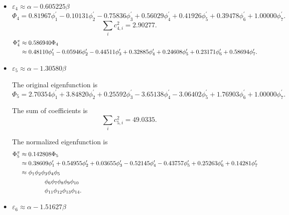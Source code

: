 \documentclass[a4paper]{book}
\begin{document}
\begin{solution}
\begin{enumerate}[label=(\alph*)]
\begin{itemize}
		
		\item $\varepsilon_4 \approx \alpha - 0.605225 \beta$
		\begin{equation*}
			\Phi_4 = 0.81967 \phi^\prime_1 -0.10131 \phi^\prime_2 -0.75836 \phi^\prime_3 + 0.56029 \phi^\prime_4 + 0.41926 \phi^\prime_5 + 0.39478 \phi^\prime_6 + 1.00000 \phi^\prime_7.
		\end{equation*}
		\begin{equation*}
			\sum_{i} c^2_{4,i} = 2.90277.
		\end{equation*}
		\begin{align}
			\Phi^\pi_4 &\approx 0.586940 \Phi_4 \notag \\
			&\approx 0.48110 \phi^\prime_1 - 0.05946 \phi^\prime_2 -0.44511 \phi^\prime_3 +0.32885 \phi^\prime_4 + 0.24608 \phi^\prime_5 + 0.23171 \phi^\prime_6 + 0.58694 \phi^\prime_7.
		\end{align}
		
		
		\item $\varepsilon_5 \approx \alpha -1.30580 \beta$
		
		The original eigenfunction is
		\begin{equation*}
			\Phi_5 = 2.70354 \phi^\prime_1 + 3.84820 \phi^\prime_2 +0.25592 \phi^\prime_3 -3.65138 \phi^\prime_4 - 3.06402 \phi^\prime_5 + 1.76903 \phi^\prime_6 + 1.00000 \phi^\prime_7.
		\end{equation*}
		
		The sum of coefficients is
		\begin{equation*}
			\sum_{i} c^2_{5,i} = 49.0335.
		\end{equation*}
		
		The normalized eigenfunction is
		\begin{align}
			\Phi^\pi_5 &\approx 0.142808 \Phi_5 \notag \\
			&\approx 0.38609 \phi^\prime_1 + 0.54955 \phi^\prime_2 +0.03655 \phi^\prime_3 -0.52145 \phi^\prime_4 - 0.43757 \phi^\prime_5 + 0.25263 \phi^\prime_6 + 0.14281 \phi^\prime_7\\
			&\approx \phi_1  \phi_2 \phi_3 \phi_4 \phi_5  \notag \\
			&\hspace*{4em} \phi_6 \phi_7 \phi_8  \phi_9  \phi_{10} \notag \\
			&\hspace*{4em} \phi_{11}  \phi_{12} \phi_{13} \phi_{14} .
		\end{align}
		
		
		\item $\varepsilon_6 \approx \alpha -1.51627 \beta$
		

\end{itemize}
\end{enumerate}
\end{solution}
\end{document}
